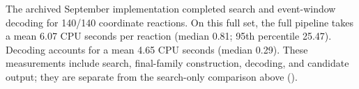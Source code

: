 The archived September implementation completed search and event-window decoding for 140/140 coordinate reactions. On this full set, the full pipeline takes a mean 6.07 CPU seconds per reaction (median 0.81; 95th percentile 25.47). Decoding accounts for a mean 4.65 CPU seconds (median 0.29). These measurements include search, final-family construction, decoding, and candidate output; they are separate from the search-only comparison above ().
